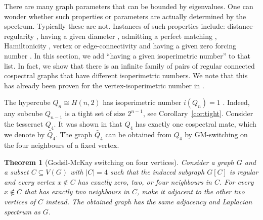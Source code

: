\documentclass[a4paper,11pt]{article}
\newtheorem{theorem}{Theorem}[section]
\theoremstyle{definition}
\begin{document}
There are many graph parameters that can be bounded by eigenvalues. One can wonder whether such properties or parameters are actually determined by the spectrum. Typically these are not. Instances of such properties include: distance-regularity \cite{h1996}, having a given diameter \cite{h1996}, admitting a perfect matching \cite{bch2015}, Hamiltonicity \cite{lwyl2010}, vertex or edge-connectivity \cite{h2020} and having a given zero forcing number \cite{MRC}.
In this section, we add ``having a given isoperimetric number'' to that list.
In fact, we show that there is an infinite family of pairs of regular connected cospectral graphs that have different isoperimetric numbers. We note that this has already been proven for the vertex-isoperimetric number in \cite{VertexNotIso}. 

The hypercube \(Q_n\cong H(n,2)\) has isoperimetric number \(i(Q_n)=1\) \cite{M1989}. Indeed, any subcube \(Q_{n-1}\) is a tight set of size \(2^{n-1}\), see Corollary~\ref{cor:tight}. Consider the tesseract \(Q_4\). It was shown in \cite{Hoffman63} that $Q_4$ has exactly one cospectral mate, which we denote by \(\widetilde{Q_4}\). The graph \(\widetilde{Q_4}\) can be obtained from \(Q_4\) by GM-switching \cite{GM82} on the four neighbours of a fixed vertex.

\begin{theorem}[Godsil-McKay switching \cite{GM82} on four vertices]\label{thm:GM}
    Consider a graph \(G\) and a subset \(C\subseteq V(G)\) with \(|C|=4\) such that the induced subgraph \(G[C]\) is regular and every vertex \(x\notin C\) has exactly zero, two, or four neighbours in \(C\). For every \(x\notin C\) that has exactly two neighbours in \(C\), make it adjacent to the other two vertices of \(C\) instead. The obtained graph has the same adjacency and Laplacian spectrum as \(G\).
\end{theorem}
\end{document}
